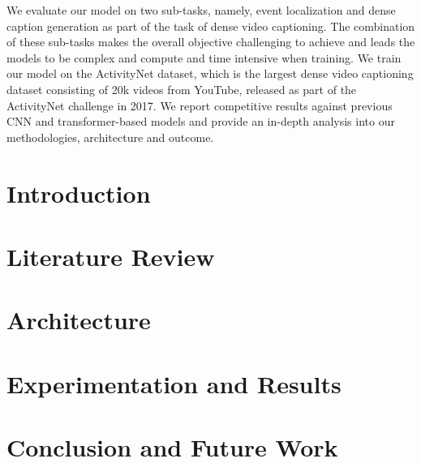 \documentclass[]{book}
\begin{document}
\par  We evaluate our model on two sub-tasks, namely, event localization and dense caption generation as part of the task of dense video captioning. The combination of these sub-tasks makes the overall objective challenging to achieve and leads the models to be complex and compute and time intensive when training. We train our model on the ActivityNet dataset, which is the largest dense video captioning dataset consisting of 20k videos from YouTube, released as part of the ActivityNet challenge in 2017. We report competitive results against previous CNN and transformer-based models and provide an in-depth analysis into our methodologies, architecture and outcome. \newline





\tableofcontents

\newpage
\thispagestyle{empty}
\listoffigures
\listoftables



\chapter{Introduction}





\chapter{Literature Review}



\chapter{Architecture}




\chapter{Experimentation and Results}


\chapter{Conclusion and Future Work}


\end{document}
